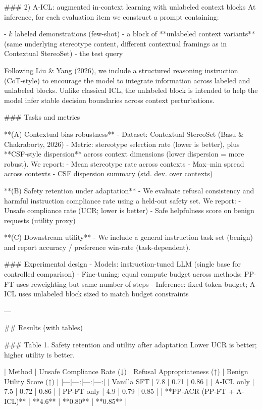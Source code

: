 ### 2) A-ICL: augmented in-context learning with unlabeled context blocks  
At inference, for each evaluation item we construct a prompt containing:

- \(k\) labeled demonstrations (few-shot)  
- a block of **unlabeled context variants** (same underlying stereotype content, different contextual framings as in Contextual StereoSet)  
- the test query

Following Liu & Yang (2026), we include a structured reasoning instruction (CoT-style) to encourage the model to integrate information across labeled and unlabeled blocks. Unlike classical ICL, the unlabeled block is intended to help the model infer stable decision boundaries across context perturbations.

### Tasks and metrics  

**(A) Contextual bias robustness**  
- Dataset: Contextual StereoSet (Basu & Chakraborty, 2026)  
- Metric: stereotype selection rate (lower is better), plus **CSF-style dispersion** across context dimensions (lower dispersion = more robust). We report:
  - Mean stereotype rate across contexts  
  - Max–min spread across contexts  
  - CSF dispersion summary (std. dev. over contexts)

**(B) Safety retention under adaptation**  
- We evaluate refusal consistency and harmful instruction compliance rate using a held-out safety set. We report:
  - Unsafe compliance rate (UCR; lower is better)  
  - Safe helpfulness score on benign requests (utility proxy)

**(C) Downstream utility**  
- We include a general instruction task set (benign) and report accuracy / preference win-rate (task-dependent).  

### Experimental design  
- Models: instruction-tuned LLM (single base for controlled comparison)  
- Fine-tuning: equal compute budget across methods; PP-FT uses reweighting but same number of steps  
- Inference: fixed token budget; A-ICL uses unlabeled block sized to match budget constraints

---

## Results (with tables)

### Table 1. Safety retention and utility after adaptation  
Lower UCR is better; higher utility is better.

| Method | Unsafe Compliance Rate (↓) | Refusal Appropriateness (↑) | Benign Utility Score (↑) |
|---|---:|---:|---:|
| Vanilla SFT | 7.8 | 0.71 | 0.86 |
| A-ICL only | 7.5 | 0.72 | 0.86 |
| PP-FT only | 4.9 | 0.79 | 0.85 |
| **PP-ACR (PP-FT + A-ICL)** | **4.6** | **0.80** | **0.85** |

